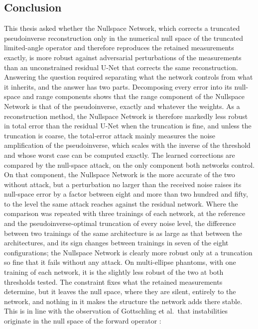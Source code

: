 \documentclass{article}
\numberwithin{equation}{section}
\begin{document}
\subsection{Conclusion}
This thesis asked whether the Nullspace Network, which corrects a truncated pseudoinverse
reconstruction only in the numerical null space of the truncated limited-angle operator and therefore
reproduces the retained measurements exactly, is more robust against adversarial perturbations of the
measurements than an unconstrained residual U-Net that corrects the same reconstruction.\\
Answering the question required separating what the network controls from what it inherits, and the
answer has two parts. Decomposing every error into its null-space and range components shows that the
range component of the Nullspace Network is that of the pseudoinverse, exactly and whatever the weights.
As a reconstruction method, the Nullspace Network is therefore markedly less robust in total error than
the residual U-Net when the truncation is fine, and unless the truncation is coarse, the total-error
attack mainly measures the noise amplification of the pseudoinverse, which scales with the inverse of
the threshold and whose worst case can be computed exactly. The learned corrections are compared by the
null-space attack, on the only component both networks control. On that component, the Nullspace Network
is the more accurate of the two without attack, but a perturbation no larger than the received
noise raises its null-space error by a factor between eight and more than two hundred and fifty, to the
level the same attack reaches against the residual network. Where the comparison was repeated with three
trainings of each network, at the reference and the pseudoinverse-optimal truncation of every noise level,
the difference between two trainings of the same architecture is as large as that between the
architectures, and its sign changes between trainings in seven of the eight configurations; the Nullspace
Network is clearly more robust only at a truncation so fine that it fails without any attack. On
multi-ellipse phantoms, with one training of each network, it is the slightly less robust of the two at
both thresholds tested. The
constraint fixes what the retained measurements
determine, but it leaves the null space, where they are silent, entirely to the network, and nothing in it
makes the structure the network adds there stable. This is in line with the observation of Gottschling et al.\ that
instabilities originate in the null space of the forward operator \parencite{gottschling2025troublesome}:
\end{document}
